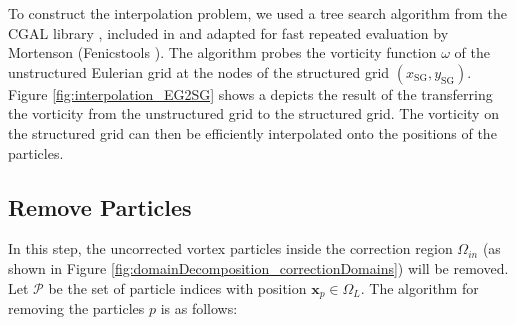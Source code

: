 	To construct the interpolation problem, we used a tree search algorithm from the CGAL library \cite{CGAL}, included in \fenics and adapted for fast repeated evaluation by Mortenson (Fenicstools \cite{fenicstools}). The algorithm probes the vorticity function $\omega$ of the unstructured Eulerian grid at the nodes of the structured grid $(x_{\mathrm{SG}}, y_{\mathrm{SG}})$. Figure \ref{fig:interpolation_EG2SG} shows a depicts the result of the transferring the vorticity from the unstructured grid to the structured grid. The vorticity on the structured grid can then be efficiently interpolated onto the positions of the particles. %
		
		
		
	\subsection{Remove Particles}
	In this step, the uncorrected vortex particles inside the correction region $\Omega_{in}$ (as shown in Figure \ref{fig:domainDecomposition_correctionDomains}) will be removed. Let $\mathcal{P}$ be the set of particle indices with position $\mathbf{x}_p\in\Omega_L$. The algorithm for removing the particles $p$ is as follows:
	
